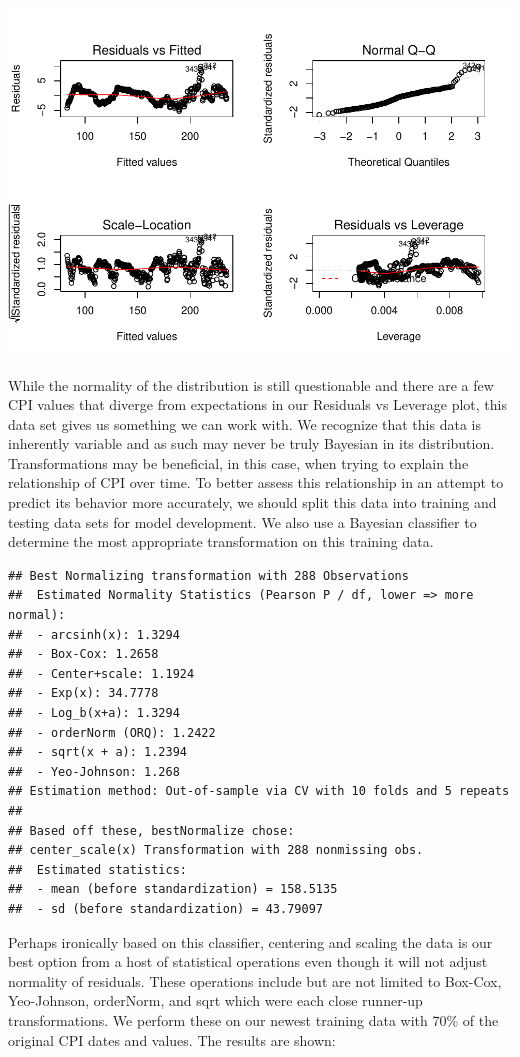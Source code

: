 \documentclass[
]{article}
\begin{document}
\includegraphics{CPIAnalysis_files/figure-latex/unnamed-chunk-8-1.pdf}

While the normality of the distribution is still questionable and there
are a few CPI values that diverge from expectations in our Residuals vs
Leverage plot, this data set gives us something we can work with. We
recognize that this data is inherently variable and as such may never be
truly Bayesian in its distribution. Transformations may be beneficial,
in this case, when trying to explain the relationship of CPI over time.
To better assess this relationship in an attempt to predict its behavior
more accurately, we should split this data into training and testing
data sets for model development. We also use a Bayesian classifier to
determine the most appropriate transformation on this training data.

\begin{verbatim}
## Best Normalizing transformation with 288 Observations
##  Estimated Normality Statistics (Pearson P / df, lower => more normal):
##  - arcsinh(x): 1.3294
##  - Box-Cox: 1.2658
##  - Center+scale: 1.1924
##  - Exp(x): 34.7778
##  - Log_b(x+a): 1.3294
##  - orderNorm (ORQ): 1.2422
##  - sqrt(x + a): 1.2394
##  - Yeo-Johnson: 1.268
## Estimation method: Out-of-sample via CV with 10 folds and 5 repeats
##  
## Based off these, bestNormalize chose:
## center_scale(x) Transformation with 288 nonmissing obs.
##  Estimated statistics:
##  - mean (before standardization) = 158.5135 
##  - sd (before standardization) = 43.79097
\end{verbatim}

Perhaps ironically based on this classifier, centering and scaling the
data is our best option from a host of statistical operations even
though it will not adjust normality of residuals. These operations
include but are not limited to Box-Cox, Yeo-Johnson, orderNorm, and sqrt
which were each close runner-up transformations. We perform these on our
newest training data with 70\% of the original CPI dates and values. The
results are shown:
\end{document}
